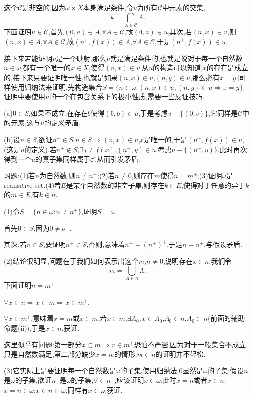 \documentclass[12pt,a4paper,openany]{book}
\begin{document}
这个$\mathscr{C}$是非空的,因为$\omega \times X$本身满足条件,令$u$为所有$\mathscr{C}$中元素的交集,
\[
u = \bigcap_{A \in \mathscr{C}}{A}.
\]
下面证明$u \in \mathscr{C}$,首先$(0,a) \in A$,$\forall A \in \mathscr{C}$,故$(0,a) \in u$,其次,若$(n,x) \in u$,则$(n,x) \in A$,$\forall A \in \mathscr{C}$,故$(n^+,f(x)) \in A$,$\forall A \in \mathscr{C}$,于是$(n^+,f(x)) \in u$.

接下来若能证明$u$是一个映射,那么$u$就是满足条件的,也就是说对于每一个自然数$n \in \omega$,都有一个唯一的$x \in X$,使得$(n,x) \in u$.从$u$的构造可以知道,$x$的存在是成立的,接下来只要证明唯一性,也就是如果$(n,x) \in u$,$(n,y) \in u$,那么必有$x=y$.同样使用归纳法来证明,先构造集合$S = \{n \in \omega : (n,x) \in u, (n,y) \in u \Rightarrow x=y\}$.证明中要使用$u$的一个在包含关系下的极小性质,需要一些反证技巧.

(a)$0 \in S$,如果不成立,在存在$b$使得$(0,b) \in u$,于是考虑$u - \{(0,b)\}$,它同样是$\mathscr{C}$中的元素,这与$u$的定义矛盾.

(b)设$n \in S$,欲证$n^+ \in S$.$n \in S$$\Rightarrow$$(n,x) \in u$,$x$是唯一的,于是$(n^+,f(x)) \in u$,(这是$u$的定义),若$n^+ \notin S$,$\exists y \neq f(x)$,$(n^+,y) \in u$,考虑$u-\{(n^+,y)\}$,此时再次得到一个$u$的真子集同样属于$\mathscr{C}$,从而引发矛盾.

习题:(1)若$n$为自然数,则$n \neq n^+$;(2)若$n \neq 0$,则存在$m$使得$n=m^+$;(3)证明$\omega$是reansitive set.(4)若$E$是某个自然数的非空子集,则存在$k \in E$,使得对于任意的异于$k$的$m \in E$,有$k \in m$.

(1)令$S = \{n \in \omega:n \neq n^+\}$,证明$S=\omega$.

首先$0 \in S$,因为$0 \neq o^+$.

其次,若$n \in S$,要证明$n^+ \in S$,否则,意味着$n^+=(n^+)^+$,于是$n=n^+$,与假设矛盾.

(2)结论很明显,问题在于我们如何表示出这个$m$,$n \neq 0$,说明存在$x \in n$.我们令
\[
m = \bigcup_{A \in n}{A}.
\]
下面证明$n=m^+$.

$\forall x \in n$$\Rightarrow$$x \subset m$$\Rightarrow$$x \in m^+$.

$\forall x \in m^+$,意味着$x=m$或$x \in m$,若$x \in m$,$\exists A_0, x \in A_0$,$A_0 \in n$,$A_0 \subset n$(前面的辅助命题(ii)),于是$x \in n$.获证.

这里似乎有问题:第一部分$x \subset m$$\Rightarrow$$x \in m^+$恐怕不严密,因为对于一般集合不成立,只是自然数满足,第二部分缺少$x=m$的情形.$m \in n$的证明并不轻松.

(3)它实际上是要证明每一个自然数是$\omega$的子集.使用归纳法.$0$显然是$\omega$的子集;假设$n$是$\omega$的子集,欲证$n^+$是$\omega$的子集,$\forall \in n^+$,应该证明$x \in \omega$,此时$x=n$或者$x \in n$,$x=n \in \omega$;$x \in n \subset \omega$,同样有$x \in \omega$.获证.
\end{document}
